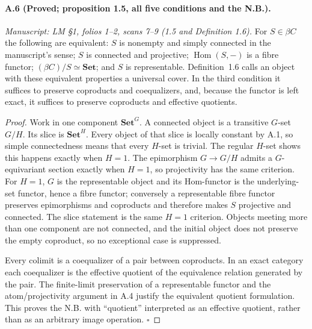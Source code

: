 \paragraph{A.6 (Proved; proposition 1.5, all five conditions and the N.B.).}
\textit{Manuscript: LM \S1, folios 1--2, scans 7--9 (1.5 and Definition 1.6).}
For $S\in\beta C$ the following are equivalent: $S$ is nonempty and simply connected in the manuscript's sense; $S$ is connected and projective; $\operatorname{Hom}(S,-)$ is a fibre functor; $(\beta C)/S\simeq\mathbf{Set}$; and $S$ is representable. Definition~1.6 calls an object with these equivalent properties a universal cover. In the third condition it suffices to preserve coproducts and coequalizers, and, because the functor is left exact, it suffices to preserve coproducts and effective quotients.
\begin{proof}
Work in one component $\mathbf{Set}^{G}$. A connected object is a transitive $G$-set $G/H$. Its slice is $\mathbf{Set}^{H}$. Every object of that slice is locally constant by A.1, so simple connectedness means that every $H$-set is trivial. The regular $H$-set shows this happens exactly when $H=1$. The epimorphism $G\to G/H$ admits a $G$-equivariant section exactly when $H=1$, so projectivity has the same criterion. For $H=1$, $G$ is the representable object and its Hom-functor is the underlying-set functor, hence a fibre functor; conversely a representable fibre functor preserves epimorphisms and coproducts and therefore makes $S$ projective and connected. The slice statement is the same $H=1$ criterion. Objects meeting more than one component are not connected, and the initial object does not preserve the empty coproduct, so no exceptional case is suppressed.

Every colimit is a coequalizer of a pair between coproducts. In an exact category each coequalizer is the effective quotient of the equivalence relation generated by the pair. The finite-limit preservation of a representable functor and the atom/projectivity argument in A.4 justify the equivalent quotient formulation. This proves the N.B. with ``quotient'' interpreted as an effective quotient, rather than as an arbitrary image operation. \hfill$\square$
\end{proof}

